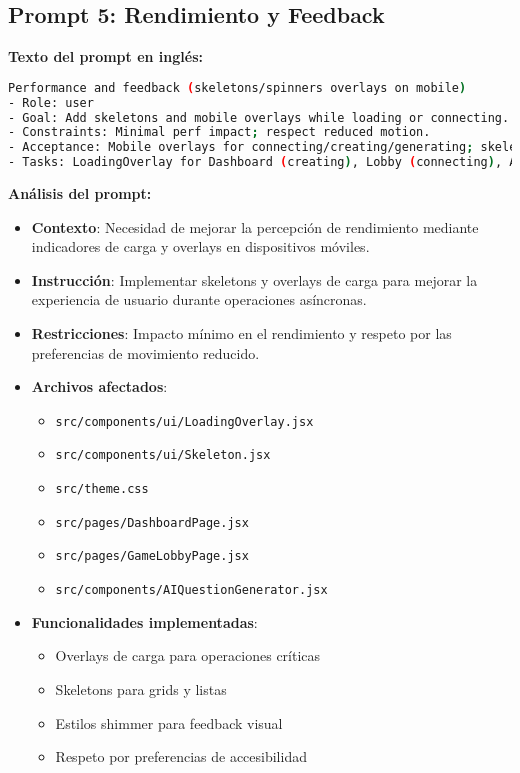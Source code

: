 \documentclass[12pt,a4paper]{article}
\begin{document}
\subsection{Prompt 5: Rendimiento y Feedback}

\textbf{Texto del prompt en inglés:}
\begin{lstlisting}[language=bash]
Performance and feedback (skeletons/spinners overlays on mobile)
- Role: user
- Goal: Add skeletons and mobile overlays while loading or connecting.
- Constraints: Minimal perf impact; respect reduced motion.
- Acceptance: Mobile overlays for connecting/creating/generating; skeletons for grids.
- Tasks: LoadingOverlay for Dashboard (creating), Lobby (connecting), AI generator (loading); skeleton grid in Dashboard and Lobby list placeholders; shimmer styling.
\end{lstlisting}

\textbf{Análisis del prompt:}
\begin{itemize}
    \item \textbf{Contexto}: Necesidad de mejorar la percepción de rendimiento mediante indicadores de carga y overlays en dispositivos móviles.
    
    \item \textbf{Instrucción}: Implementar skeletons y overlays de carga para mejorar la experiencia de usuario durante operaciones asíncronas.
    
    \item \textbf{Restricciones}: Impacto mínimo en el rendimiento y respeto por las preferencias de movimiento reducido.
    
    \item \textbf{Archivos afectados}:
    \begin{itemize}
        \item \texttt{src/components/ui/LoadingOverlay.jsx}
        \item \texttt{src/components/ui/Skeleton.jsx}
        \item \texttt{src/theme.css}
        \item \texttt{src/pages/DashboardPage.jsx}
        \item \texttt{src/pages/GameLobbyPage.jsx}
        \item \texttt{src/components/AIQuestionGenerator.jsx}
    \end{itemize}
    
    \item \textbf{Funcionalidades implementadas}:
    \begin{itemize}
        \item Overlays de carga para operaciones críticas
        \item Skeletons para grids y listas
        \item Estilos shimmer para feedback visual
        \item Respeto por preferencias de accesibilidad
    \end{itemize}
\end{itemize}
\end{document}
